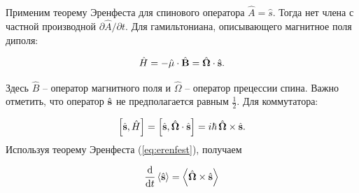 \begin{frame}
	\frametitle{}
	\par Применим теорему Эренфеста для спинового оператора $\hat{A} = \hat{s}$. Тогда нет члена с частной производной $\partial\hat{A} / \partial t$. Для гамильтониана, описывающего магнитное поля диполя:
	
	\begin{equation}
		\hat{H} = - \hat{\vectorbold{\mu}} \cdot \hat{\vectorbold{B}} = \hat{\boldsymbol{\Omega}} \cdot \hat{\vectorbold{s}}.
		\label{eq:mag_Ham}
	\end{equation}
	
	\noindent Здесь $\hat{B}$ – оператор магнитного поля и $\hat{\Omega}$ – оператор прецессии спина. Важно отметить, что оператор $\hat{\vectorbold{s}}$ не предполагается равным $\frac{1}{2}$. Для коммутатора:
	
	\begin{equation}
		\left[\hat{\vectorbold{s}}, \hat{H}\right] = \left[\hat{\vectorbold{s}}, \hat{\boldsymbol{\Omega}} \cdot \hat{\vectorbold{s}}\right] = i \hbar\, \hat{\boldsymbol{\Omega}} \times \hat{\vectorbold{s}}.
		\label{eq:commutator_s_H}
	\end{equation}
	\noindent Используя теорему Эренфеста (\ref{eq:erenfest}), получаем
	
	\begin{equation}
		\dv{}{t} \left\langle\hat{\vectorbold{s}}\right\rangle = \left\langle\hat{\boldsymbol{\Omega}} \times \hat{\vectorbold{s}}\right\rangle
		\label{eq:dsdt}
	\end{equation}

\end{frame}

